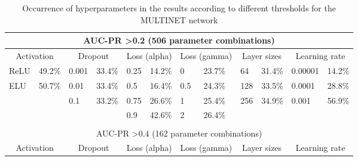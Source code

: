 \documentclass[ppgc, diss, english]{iiufrgs}
\begin{document}
\begin{table}[!th]
\caption{Occurrence of hyperparameters in the results according to different thresholds for the MULTINET network \label{tab:occurrence_hyperparameters_multinet}}
\centering
 \begin{adjustbox}{scale=0.9,center}

\begin{tabular}{llllllllllll}
\hline
\multicolumn{12}{c}{AUC-PR \textgreater 0.2 (506 parameter combinations)}                                                                                                                                \\ \hline
\multicolumn{2}{c}{Activation} & \multicolumn{2}{c}{Dropout} & \multicolumn{2}{c}{Loss (alpha)} & \multicolumn{2}{c}{Loss (gamma)} & \multicolumn{2}{c}{Layer sizes} & \multicolumn{2}{c}{Learning rate} \\
ReLU          & 49.2\%         & 0.001        & 33.4\%       & 0.25           & 14.2\%          & 0             & 23.7\%           & 64            & 31.4\%          & 0.00001          & 14.2\%         \\
ELU           & 50.7\%         & 0.01         & 33.4\%       & 0.5            & 16.4\%          & 0.5           & 24.3\%           & 128           & 33.5\%          & 0.0001           & 28.8\%         \\
              &                & 0.1          & 33.2\%       & 0.75           & 26.6\%          & 1             & 25.4\%           & 256           & 34.9\%          & 0.001            & 56.9\%         \\
              &                &              &              & 0.9            & 42.6\%          & 2             & 26.4\%           &               &                 &                  &                \\
              &                &              &              &                &                 &               &                  &               &                 &                  &                \\ \hline
\multicolumn{12}{c}{AUC-PR \textgreater 0.4 (162 parameter combinations)}                                                                                                                                \\ \hline
\multicolumn{2}{c}{Activation} & \multicolumn{2}{c}{Dropout} & \multicolumn{2}{c}{Loss (alpha)} & \multicolumn{2}{c}{Loss (gamma)} & \multicolumn{2}{c}{Layer sizes} & \multicolumn{2}{c}{Learning rate} \\

\end{tabular}
\end{adjustbox}
\end{table}
\end{document}
